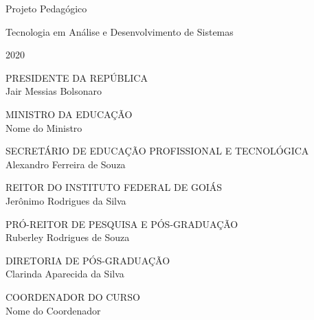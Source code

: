 \documentclass[11pt,fleqn]{book} %
\begin{document}
\let\cleardoublepage\clearpage

\renewcommand{\chaptername}{Capítulo}
\renewcommand{\figurename}{Fig.}

\begingroup
	\thispagestyle{empty}
	
	
	
	
	\vspace*{4.5cm}
	
	\centering
	\par
	{\Huge Projeto Pedagógico}\vspace*{1.5cm}
	\par
	\fontsize{40}{40}
	\selectfont
	Tecnologia em Análise e Desenvolvimento de Sistemas
	\vspace*{10cm}
	\par
	{\Huge 2020}
	\par
\endgroup
\pagebreak

\begin{center}
	\par
	{\large PRESIDENTE DA REPÚBLICA \\ Jair Messias Bolsonaro}\vspace*{1cm}
	\par
	{\large MINISTRO DA EDUCAÇÃO \\ Nome do Ministro}\vspace*{1cm}
	\par
	{\large SECRETÁRIO DE EDUCAÇÃO PROFISSIONAL E TECNOLÓGICA \\ Alexandro Ferreira de Souza}\vspace*{1cm}
	\par
	{\large REITOR DO INSTITUTO FEDERAL DE GOIÁS \\ Jerônimo Rodrigues da Silva}\vspace*{1cm}
	\par
	{\large PRÓ-REITOR DE PESQUISA E PÓS-GRADUAÇÃO \\ Ruberley Rodrigues de Souza}\vspace*{1cm}
	\par
	{\large DIRETORIA DE PÓS-GRADUAÇÃO \\ Clarinda Aparecida da Silva}\vspace*{1cm}
	\par
	{\large COORDENADOR DO CURSO \\ Nome do Coordenador}\vspace*{1cm}
\end{center}
\end{document}
